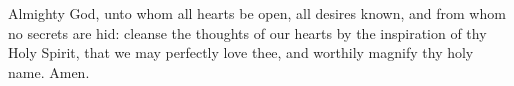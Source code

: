 \documentclass[MAIN]{subfiles}
\begin{document}
Almighty God, unto whom all hearts be open, all desires known, and from whom no secrets are hid: cleanse the thoughts of our hearts by the inspiration of thy Holy Spirit, that we may perfectly love thee, and worthily magnify thy holy name. Amen.
\end{document}
